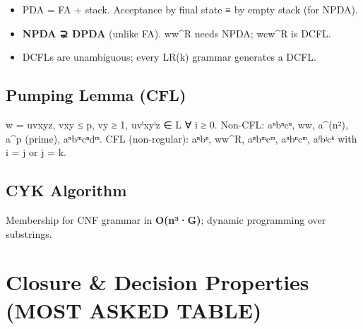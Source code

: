 \begin{itemize}
\tightlist
\item
  PDA = FA + stack. Acceptance by final state ≡ by empty stack (for NPDA).
\item
  \textbf{NPDA ⊋ DPDA} (unlike FA). ww\^{}R needs NPDA; wcw\^{}R is DCFL.
\item
  DCFLs are unambiguous; every LR(k) grammar generates a DCFL.
\end{itemize}



\needspace{262pt}

\hypertarget{p2-08--54-pumping-lemma-cfl}{%
\subsection{Pumping Lemma (CFL)}\label{p2-08--54-pumping-lemma-cfl}}

w = uvxyz, \textbar vxy\textbar{} ≤ p, \textbar vy\textbar{} ≥ 1, uvⁱxyⁱz ∈ L ∀ i ≥ 0.
Non-CFL: aⁿbⁿcⁿ, ww, a\^{}(n²), a\^{}p (prime), aⁿbᵐcⁿdᵐ.
CFL (non-regular): aⁿbⁿ, ww\^{}R, aⁿbᵐcᵐ, aⁿbⁿcᵐ, aⁱbʲcᵏ with i = j or j = k.

\needspace{196pt}

\hypertarget{p2-08--55-cyk-algorithm}{%
\subsection{CYK Algorithm}\label{p2-08--55-cyk-algorithm}}

Membership for CNF grammar in \textbf{O(n³·\textbar G\textbar)}; dynamic programming over substrings.

\needspace{130pt}

\hypertarget{p2-08--6-closure--decision-properties-most-asked-table}{%
\section{Closure \& Decision Properties (MOST ASKED TABLE)}\label{p2-08--6-closure--decision-properties-most-asked-table}}

\begingroup\small

